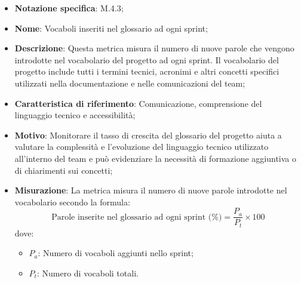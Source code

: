 \begin{itemize}
    \item \textbf{Notazione specifica}: M.4.3;
    \item \textbf{Nome}: Vocaboli inseriti nel glossario ad ogni sprint;
    \item \textbf{Descrizione}: Questa metrica misura il numero di nuove parole che vengono introdotte nel vocabolario del progetto ad ogni sprint. Il vocabolario del progetto include tutti i termini tecnici, acronimi e altri concetti specifici utilizzati nella documentazione e nelle comunicazioni del team;
    \item \textbf{Caratteristica di riferimento}: Comunicazione, comprensione del linguaggio tecnico e accessibilità;
    \item \textbf{Motivo}: Monitorare il tasso di crescita del glossario del progetto aiuta a valutare la complessità e l'evoluzione del linguaggio tecnico utilizzato all'interno del team e può evidenziare la necessità di formazione aggiuntiva o di chiarimenti sui concetti;
    \item \textbf{Misurazione}: La metrica misura il numero di nuove parole introdotte nel vocabolario secondo la formula:
    \[
        \text{Parole inserite nel glossario ad ogni sprint (\%)} =\frac{P_{a}}{P_{t}} \times 100 
    \]
    dove:
    \begin{itemize}
        \item $P_{a}$: Numero di vocaboli aggiunti nello sprint;
        \item $P_{t}$: Numero di vocaboli totali.
    \end{itemize}
    
    
\end{itemize}
